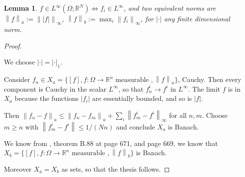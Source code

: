 \documentclass[english,a4paper,12pt,oneside]{scrbook}
\theoremstyle{break}
\newtheorem{lemma}[equation]{Lemma}
\newenvironment{mproof}[1][\proofname]{%
  \begin{proof}[#1]$ $\par\nobreak\ignorespaces
}{%
  \end{proof}
}
\renewcommand*{\proofname}{Proof}
\theoremstyle{remark}
\newcommand{\mR}{\mathbb{R}}
\newcommand{\norm}[1]{\left\lVert#1\right\rVert}
\begin{document}
\begin{lemma}
$f \in L^\infty(\Omega; \mR^N) \iff f_i \in L^\infty$, and two equivalent norms are $\norm{f}_a:=\norm{|f|}_\infty$, $\norm{f}_b:=\max_i\norm{f_i}_\infty$, for $|\cdot |$ any finite dimensional norm.
\end{lemma}
\begin{mproof}

We choose $|\cdot |=|\cdot|_1$.

Consider $f_n \in X_a = \{[f], f: \Omega \rightarrow \mR^n \text{ measurable }, \norm{f}_a\}$, Cauchy. Then every component is Cauchy in the scalar $L^\infty$, so that $f_n^i \rightarrow f^i $ in $L^\infty$. The limit $f$ is in $X_a$ because the functions $|f_i|$ are essentially bounded, and so is $|f|$. 

Then $\norm{f_n-f}_a\leq \norm{f_n-f_m}_a+\sum_i\norm{f_m^i-f^i}_\infty$ for all $n,m$. Choose $m\geq n$ with $\norm{f_m^i-f^i}\leq 1/(Nn)$ and conclude $X_a$ is Banach.

We know from \cite{leoni}, theorem B.88 at page 671, and page 669, we know that $X_b = \{[f], f: \Omega \rightarrow \mR^n \text{ measurable }, \norm{f}_b\}$ is Banach.

Moreover $X_a=X_b$ as sets, so that the thesis follows.


%
%
%
%
%
%

\end{mproof}
\end{document}
